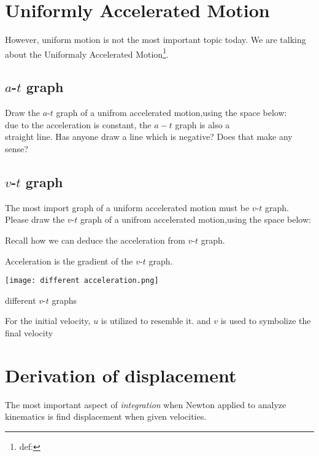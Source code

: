\documentclass[a4paper]{tufte-handout}
\newenvironment{SummBox}
{\begin{tcolorbox}[breakable,colback=r1!30,colframe=r1,title=Summary]} {\end{tcolorbox}}
\begin{document}
\section{Uniformly Accelerated Motion}
However, uniform motion is not the most important topic today. We are talking about the Uniformaly Accelerated Motion\footnote{def:}.
\subsection{$a$-$t$ graph}
Draw the $a$-$t$ graph of a unifrom accelerated motion,using the space below:\\
\vspace{0.5 in}
due to the acceleration is constant, the $a-t$ graph is also a \\
\uline{\hspace{0.8 in}} straight line. Has anyone draw a line which is negative? Does that make any sense?

\subsection{$v$-$t$ graph}
The most import graph of a uniform accelerated motion must be $v$-$t$ graph. Please draw the $v$-$t$ graph of a unifrom accelerated motion,using the space below:\\
\vspace{0.5 in}

Recall how we can deduce the acceleration from $v$-$t$ graph.
\begin{SummBox}
Acceleration is the gradient of the $v$-$t$ graph.
\end{SummBox}

\begin{marginfigure}
\texttt{[image: different acceleration.png]}
\caption{different $v$-$t$ graphs}
\label{fig:multiple vt graghs}
\end{marginfigure}

For the initial velocity, $u$ is utilized to resemble it. and $v$ is used to symbolize the final velocity

\section{Derivation of displacement}
The most important aspect of \emph{integration} when Newton applied to analyze kinematics is find displacement when given velocities.
\end{document}
